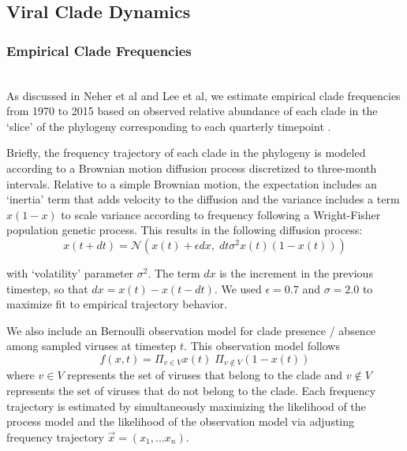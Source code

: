 \documentclass[11pt,oneside,letterpaper]{article}
\begin{document}
\subsection*{Viral Clade Dynamics}
\subsubsection{Empirical Clade Frequencies}\\
As discussed in Neher et al and Lee et al, we estimate empirical clade frequencies from 1970 to 2015 based on observed relative abundance of each clade in the `slice' of the phylogeny corresponding to each quarterly timepoint \citep{lee2018deep,neher2016prediction}.

Briefly, the frequency trajectory of each clade in the phylogeny is modeled according to a Brownian motion diffusion process discretized to three-month intervals.
Relative to a simple Brownian motion, the expectation includes an `inertia' term that adds velocity to the diffusion and the variance includes a term $x(1-x)$ to scale variance according to frequency following a Wright-Fisher population genetic process.
This results in the following diffusion process:
\begin{equation}
  \label{eq_estimate_frequency}
x(t+dt) = \mathcal{N}\left(x(t) + \epsilon dx, \; dt \sigma^2 x(t) (1-x(t))\right)
\end{equation}

with `volatility' parameter $\sigma^2$.
The term $dx$ is the increment in the previous timestep, so that $dx = x(t) - x(t-dt)$.
We used $\epsilon = 0.7$ and $\sigma = 2.0$ to maximize fit to empirical trajectory behavior.

We also include an Bernoulli observation model for clade presence / absence among sampled viruses at timestep $t$.
This observation model follows
\begin{equation}
f(x,t) = \Pi_{v \in V} x(t) \; \Pi_{v \notin V} (1-x(t))
\end{equation}
where $v \in V$ represents the set of viruses that belong to the clade and $v \notin V$ represents the set of viruses that do not belong to the clade.
Each frequency trajectory is estimated by simultaneously maximizing the likelihood of the process model and the likelihood of the observation model via adjusting frequency trajectory $\vec{x} = (x_1, ... x_n)$.
\end{document}
